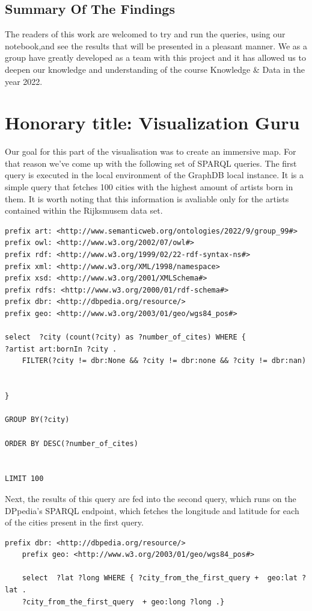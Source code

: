 \documentclass{article}
\begin{document}
\subsection{Summary Of The Findings}

The readers of this work are welcomed to try and run the queries, using our notebook\cite{notebook},and see the results that will be presented in a pleasant manner. We as a group have greatly developed as a team with this project and it has allowed us to deepen our knowledge and understanding of the course Knowledge & Data in the year 2022. 
\section{Honorary title: Visualization Guru}

Our goal for this part of the visualisation was to create an immersive map. For that reason we've come up with the following set of SPARQL queries. The first query is executed in the local environment of the GraphDB local instance. It is a simple query that fetches 100 cities with the highest amount of artists born in them. It is worth noting that this information is avaliable only for the artists contained within the Rijksmusem data set. 

\begin{verbatim}
prefix art: <http://www.semanticweb.org/ontologies/2022/9/group_99#> 
prefix owl: <http://www.w3.org/2002/07/owl#> 
prefix rdf: <http://www.w3.org/1999/02/22-rdf-syntax-ns#> 
prefix xml: <http://www.w3.org/XML/1998/namespace> 
prefix xsd: <http://www.w3.org/2001/XMLSchema#> 
prefix rdfs: <http://www.w3.org/2000/01/rdf-schema#> 
prefix dbr: <http://dbpedia.org/resource/>
prefix geo: <http://www.w3.org/2003/01/geo/wgs84_pos#>

select  ?city (count(?city) as ?number_of_cites) WHERE { 
?artist art:bornIn ?city .
    FILTER(?city != dbr:None && ?city != dbr:none && ?city != dbr:nan)
 

}

GROUP BY(?city)

ORDER BY DESC(?number_of_cites)


LIMIT 100
\end{verbatim}


Next, the results of this query are fed into the second query, which runs on the DPpedia's SPARQL endpoint, which fetches the longitude and latitude for each of the cities present in the first query. 

\begin{verbatim}
prefix dbr: <http://dbpedia.org/resource/>
    prefix geo: <http://www.w3.org/2003/01/geo/wgs84_pos#>

    select  ?lat ?long WHERE { ?city_from_the_first_query +  geo:lat ?lat . 
    ?city_from_the_first_query  + geo:long ?long .}
\end{verbatim}
\end{document}
